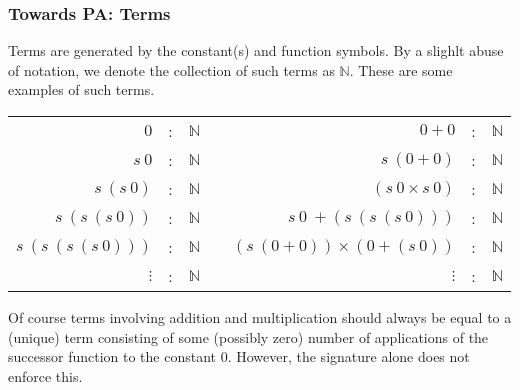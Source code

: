 \documentclass{beamer}
\theoremstyle{indentDefn} \newtheorem{defn}[]{Definition}
\begin{document}
\begin{frame}
	\frametitle{Towards PA: Terms}

	Terms are generated by the constant(s) and function symbols. By a slighlt abuse of notation, we denote the collection of such terms as $\mathbb{N}$. These are some examples of such terms. 

	\begin{center}
		\begin{tabular}{r c c c r c c}
			$0$ & : & $\mathbb{N}$ & \hspace{0.5cm} & $0 + 0$ & : & $\mathbb{N}$ \\
			$s \ 0$ & : & $\mathbb{N}$ & \hspace{0.5cm} & $s \ (0 + 0)$ & : & $\mathbb{N}$ \\
			$s \ (s \ 0)$ & : & $\mathbb{N}$ & \hspace{0.5cm} & $(s \ 0 \times s \ 0)$ & : & $\mathbb{N}$ \\
			$s \ (s \ (s \ 0))$ & : & $\mathbb{N}$ & \hspace{0.5cm} & $s \ 0 \ + (s \ (s \ (s \ 0)))$ & : & $\mathbb{N}$ \\
			$s \ (s \ (s \ (s \ 0)))$ & : & $\mathbb{N}$ & \hspace{0.5cm} & $(s \ (0 + 0)) \times (0 + (s \ 0))$ & : & $\mathbb{N}$ \\		
			$\vdots$ & : & $\mathbb{N}$ & \hspace{0.5cm} & $\vdots$ & : & $\mathbb{N}$			
		\end{tabular}
	\end{center}

	Of course terms involving addition and multiplication should always be equal to a (unique) term consisting of some (possibly zero) number of applications of the successor function to the constant 0. However, the signature alone does not enforce this.  

\end{frame}
\end{document}
